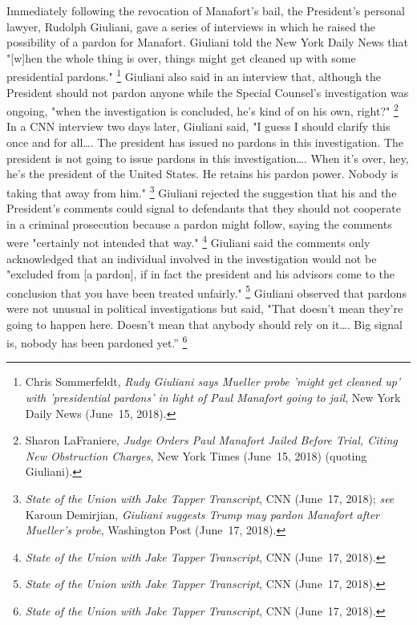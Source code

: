 Immediately following the revocation of Manafort's bail, the President's personal lawyer, Rudolph Giuliani, gave a series of interviews in which he raised the possibility of a pardon for Manafort.
Giuliani told the New York Daily News that "[w]hen the whole thing is over, things might get cleaned up with some presidential pardons."%
\footnote{Chris Sommerfeldt, \textit{Rudy Giuliani says Mueller probe 'might get cleaned up' with 'presidential pardons' in light of Paul Manafort going to jail}, New York Daily News (June~15, 2018).}
Giuliani also said in an interview that, although the President should not pardon anyone while the Special Counsel's investigation was ongoing, "when the investigation is concluded, he's kind of on his own, right?"%
\footnote{Sharon LaFraniere, \textit{Judge Orders Paul Manafort Jailed Before Trial, Citing New Obstruction Charges}, New York Times (June~15, 2018) (quoting Giuliani).}
In a CNN interview two days later, Giuliani said, "I guess I should clarify this once and for all\dots.
The president has issued no pardons in this investigation.
The president is not going to issue pardons in this investigation\dots. When it's over, hey, he's the president of the United States.
He retains his pardon power.
Nobody is taking that away from him."%
\footnote{\textit{State of the Union with Jake Tapper Transcript}, CNN (June~17, 2018);
\textit{see} Karoun Demirjian, \textit{Giuliani suggests Trump may pardon Manafort after Mueller's probe}, Washington Post (June~17, 2018).}
Giuliani rejected the suggestion that his and the President's comments could signal to defendants that they should not cooperate in a criminal prosecution because a pardon might follow, saying the comments were "certainly not intended that way."%
\footnote{\textit{State of the Union with Jake Tapper Transcript}, CNN (June~17, 2018).}
Giuliani said the comments only acknowledged that an individual involved in the investigation would not be "excluded from [a pardon], if in fact the president and his advisors come to the conclusion that you have been treated unfairly."%
\footnote{\textit{State of the Union with Jake Tapper Transcript}, CNN (June~17, 2018).}
Giuliani observed that pardons were not unusual in political investigations but said, "That doesn't mean they're going to happen here.
Doesn't mean that anybody should rely on it\dots.
Big signal is, nobody has been pardoned yet.''%
\footnote{\textit{State of the Union with Jake Tapper Transcript}, CNN (June~17, 2018).}

